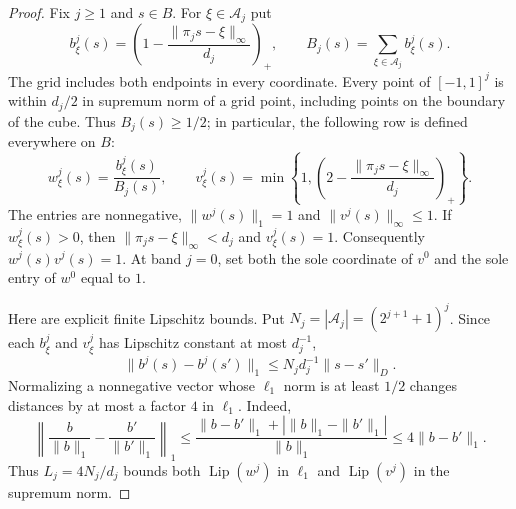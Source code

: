 \begin{proof}
Fix $j\geq1$ and $s\in B$.  For $\xi\in\mathcal A_j$ put
\[
 b^j_\xi(s)
   =\left(1-\frac{\|\pi_j s-\xi\|_\infty}{d_j}\right)_+,
 \qquad B_j(s)=\sum_{\xi\in\mathcal A_j}b^j_\xi(s).
\]
The grid includes both endpoints in every coordinate.  Every point of
$[-1,1]^j$ is within $d_j/2$ in supremum norm of a grid point, including
points on the boundary of the cube.  Thus $B_j(s)\geq1/2$; in particular,
the following row is defined everywhere on $B$:
\[
 w^j_\xi(s)=\frac{b^j_\xi(s)}{B_j(s)},\qquad
 v^j_\xi(s)
   =\min\!\left\{1,
       \left(2-\frac{\|\pi_j s-\xi\|_\infty}{d_j}\right)_+\right\}.
\]
The entries are nonnegative, $\|w^j(s)\|_1=1$ and
$\|v^j(s)\|_\infty\leq1$.  If $w^j_\xi(s)>0$, then
$\|\pi_j s-\xi\|_\infty<d_j$ and $v^j_\xi(s)=1$.
Consequently $w^j(s)v^j(s)=1$.  At band $j=0$, set both the sole
coordinate of $v^0$ and the sole entry of $w^0$ equal to $1$.

Here are explicit finite Lipschitz bounds.  Put
$N_j=|\mathcal A_j|=(2^{j+1}+1)^j$.  Since each $b^j_\xi$ and
$v^j_\xi$ has Lipschitz constant at most $d_j^{-1}$,
\[
 \|b^j(s)-b^j(s')\|_1
      \leq N_jd_j^{-1}\|s-s'\|_D.
\]
Normalizing a nonnegative vector whose $\ell_1$ norm is at least $1/2$
changes distances by at most a factor $4$ in $\ell_1$.  Indeed,
\[
 \left\|\frac b{\|b\|_1}-\frac{b'}{\|b'\|_1}\right\|_1
 \leq\frac{\|b-b'\|_1+|\|b\|_1-\|b'\|_1|}{\|b\|_1}
 \leq4\|b-b'\|_1.
\]
Thus $L_j=4N_j/d_j$ bounds both $\operatorname{Lip}(w^j)$ in
$\ell_1$ and $\operatorname{Lip}(v^j)$ in the supremum norm.


\end{proof}
